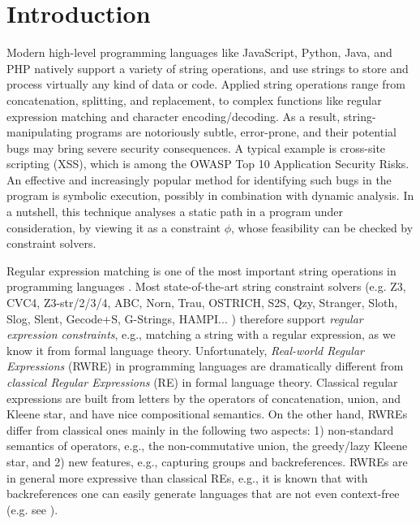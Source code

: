 
\section{Introduction}



%
Modern high-level programming languages like JavaScript, Python, Java,
and PHP natively support a variety of string operations, and use
strings to store and process virtually any kind of data or code.
Applied string operations range from concatenation, splitting, and
replacement, to complex functions like regular expression matching and
character
encoding/decoding.  As a result, string-manipulating programs are
notoriously subtle, error-prone, and their potential bugs may bring
severe security consequences. A typical example is cross-site
scripting (XSS), which is among the OWASP Top 10 Application Security
Risks.
An effective and increasingly popular method for identifying such bugs
in the program is symbolic execution, possibly in combination with dynamic
analysis. In a nutshell, this technique analyses a static path in
a program under consideration, by viewing it as a constraint $\phi$, whose 
feasibility can be checked by constraint solvers.

Regular expression matching is one of the most important string operations
in programming languages \cite{Berkeley-JavaScript,BM17,LMK19,HAMPI}.
Most state-of-the-art string constraint solvers (e.g.
Z3, CVC4, Z3-str/2/3/4, ABC, Norn, Trau, OSTRICH, S2S, Qzy, Stranger, Sloth, Slog, Slent, Gecode+S, G-Strings, HAMPI... ) therefore support
 \emph{regular expression constraints}, e.g., matching a string with a 
regular expression, as we know it from formal language theory. Unfortunately, 
\emph{Real-world Regular Expressions} (RWRE) in programming languages are dramatically different from 
\emph{classical Regular Expressions} (RE) in formal language theory. 
Classical regular expressions are built from letters by the operators of
concatenation, union, and Kleene star, and have nice compositional semantics. On
the other hand, RWREs differ from classical ones mainly in the following two 
aspects: 1) non-standard semantics of 
operators, e.g., the non-commutative union, the greedy/lazy Kleene star, and 2) new 
features, e.g., capturing groups and backreferences.
RWREs are in general more expressive than classical REs, e.g., it is known that
with backreferences one can easily generate languages that are not even 
context-free (e.g. see \cite{FS19,Aho90,BM17b}). %

